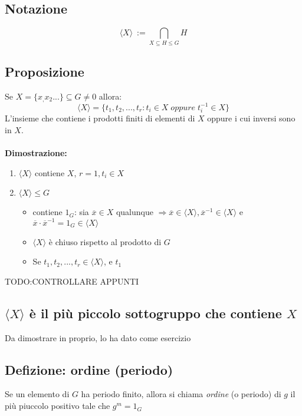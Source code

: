 \subsection{Notazione}
\[\langle X \rangle\ := \bigcap _{X\subseteq H\leq G} H\]

\subsection{Proposizione}
Se \(X=\{x_,x_2...\}\subseteq G \neq 0\) allora:
\[\langle X\rangle=\{t_1,t_2,...,t_r:t_i\in X\;oppure\; t_i^{-1}\in X\}\]
L'insieme che contiene i prodotti finiti di elementi di \(X\) oppure i cui inversi sono in \(X\).
\\
\\\textbf{Dimostrazione:}
\begin{enumerate}
	\item \(\langle X \rangle\) contiene \(X\), \(r=1, t_i\in X\)

	\item \(\langle X\rangle\leq G\) 

	\begin{itemize}

		\item contiene \(1_G\): sia \(\overline{x}\in X\) qualunque \(\Rightarrow\overline{x}\in\langle X\rangle ,\overline{x}^{-1}\in\langle X\rangle\) e \(\overline{x}\cdot\overline{x}^{-1}=1_G\in\langle X\rangle\)

		\item \(\langle X\rangle\) è chiuso rispetto al prodotto di \(G\)

		\item Se \(t_1,t_2,...,t_r\in\langle X\rangle\), e \(t_1\)

	\end{itemize}


\end{enumerate}

TODO:CONTROLLARE APPUNTI

\subsection{\(\langle X\rangle\) è il più piccolo sottogruppo che contiene \(X\)}
Da dimostrare in proprio, lo ha dato come esercizio

\subsection{Defizione: ordine (periodo)}
Se un elemento di \(G\) ha periodo finito, allora si chiama \textit{ordine} (o periodo) di \(g\) il più piuccolo positivo tale che \(g^m=1_G\)

